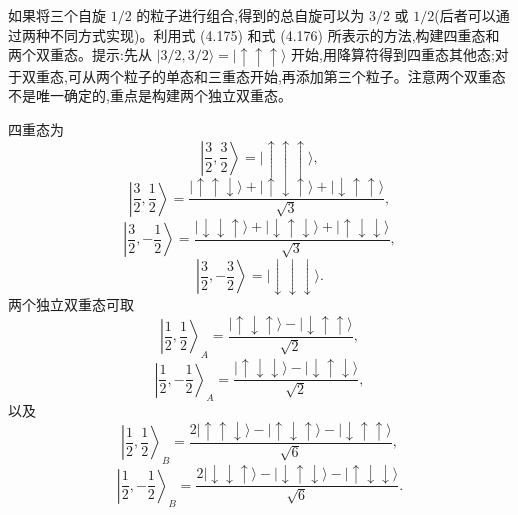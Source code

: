 \begin{question}
如果将三个自旋 $1/2$ 的粒子进行组合,得到的总自旋可以为 $3/2$ 或 $1/2$(后者可以通过两种不同方式实现)。利用式 (4.175) 和式 (4.176) 所表示的方法,构建四重态和两个双重态。提示:先从 $|3/2,3/2\rangle=|\uparrow\uparrow\uparrow\rangle$ 开始,用降算符得到四重态其他态;对于双重态,可从两个粒子的单态和三重态开始,再添加第三个粒子。注意两个双重态不是唯一确定的,重点是构建两个独立双重态。

\par\smallskip
{}

\begin{solution}

四重态为
\[
\left|\frac32,\frac32\right\rangle=|\uparrow\uparrow\uparrow\rangle,
\]
\[
\left|\frac32,\frac12\right\rangle=\frac{|\uparrow\uparrow\downarrow\rangle+|\uparrow\downarrow\uparrow\rangle+|\downarrow\uparrow\uparrow\rangle}{\sqrt3},
\]
\[
\left|\frac32,-\frac12\right\rangle=\frac{|\downarrow\downarrow\uparrow\rangle+|\downarrow\uparrow\downarrow\rangle+|\uparrow\downarrow\downarrow\rangle}{\sqrt3},
\]
\[
\left|\frac32,-\frac32\right\rangle=|\downarrow\downarrow\downarrow\rangle.
\]
两个独立双重态可取
\[
\left|\frac12,\frac12\right\rangle_A=\frac{|\uparrow\downarrow\uparrow\rangle-|\downarrow\uparrow\uparrow\rangle}{\sqrt2},
\]
\[
\left|\frac12,-\frac12\right\rangle_A=\frac{|\uparrow\downarrow\downarrow\rangle-|\downarrow\uparrow\downarrow\rangle}{\sqrt2},
\]
以及
\[
\left|\frac12,\frac12\right\rangle_B=\frac{2|\uparrow\uparrow\downarrow\rangle-|\uparrow\downarrow\uparrow\rangle-|\downarrow\uparrow\uparrow\rangle}{\sqrt6},
\]
\[
\left|\frac12,-\frac12\right\rangle_B=\frac{2|\downarrow\downarrow\uparrow\rangle-|\downarrow\uparrow\downarrow\rangle-|\uparrow\downarrow\downarrow\rangle}{\sqrt6}.
\]

\end{solution}
\end{question}

